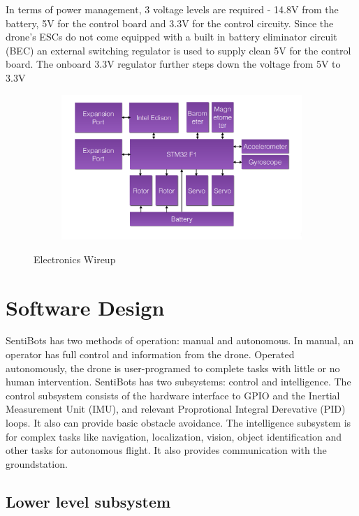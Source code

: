 \documentclass[12pt]{article}
\begin{document}
In terms of power management, 3 voltage levels are required - 14.8V from the battery, 5V for the control board and 3.3V for the control circuity. Since the drone’s ESCs do not come equipped with a built in battery eliminator circuit (BEC) an external switching regulator is used to supply clean 5V for the control board. The onboard 3.3V regulator further steps down the voltage from 5V to 3.3V

\begin{figure}[h]
	\centering
	\begin{subfigure}{0.5\textwidth}
		\centering
		\includegraphics[width=1\linewidth]{framework.png}
	\end{subfigure}
	\caption{Electronics Wireup}
	\label{fig:electronics}
\end{figure}

\section{Software Design}

SentiBots has two methods of operation: manual and autonomous. In manual, an operator has full control and information from the drone. Operated autonomously, the drone is user-programed to complete tasks with little or no human intervention. SentiBots has two subsystems: control and intelligence. The control subsystem consists of the hardware interface to GPIO and the Inertial Measurement Unit (IMU), and relevant Proprotional Integral Derevative (PID) loops. It also can provide basic obstacle avoidance. The intelligence subsystem is for complex tasks like navigation, localization, vision, object identification and other tasks for autonomous flight. It also provides communication with the groundstation.

\subsection{Lower level subsystem}
\end{document}
